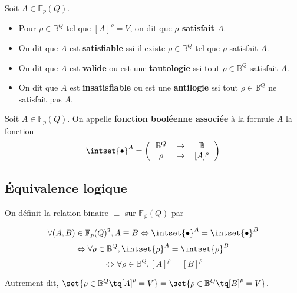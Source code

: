 \documentclass{scrartcl}
\begin{document}
			Soit $A \in \mathbb{F}_p (Q)$.

			\begin{itemize}
				\item Pour $\rho \in \mathbb{B}^Q$ tel que $[A]^\rho = V$, on dit que \textbf{$\rho$ satisfait $A$}.
				\item On dit que $A$ est \textbf{satisfiable} ssi il existe $\rho \in \mathbb{B}^Q$ tel que $\rho$ satisfait $A$.
				\item On dit que $A$ est \textbf{valide} ou est une \textbf{tautologie} ssi tout $\rho \in \mathbb{B}^Q$ satisfait $A$. 
				\item On dit que $A$ est \textbf{insatisfiable} ou est une \textbf{antilogie} ssi tout $\rho \in \mathbb{B}^Q$ ne satisfait pas $A$. 
			\end{itemize}	


			 Soit $A \in \mathbb{F}_p(Q)$. On appelle \textbf{fonction booléenne associée} à la formule $A$ la fonction
			\[
				\intset{\bullet}^A = \left(
				\begin{tabular}{c c c}
					$\mathbb{B}^Q$ & $\rightarrow$ & $\mathbb{B}$ \\
					$\rho$ & $\rightarrow$ & $[A]^\rho$
				\end{tabular}
				\right)
			\]
			

		\subsection{Équivalence logique}
			On définit la relation binaire $\equiv$ sur $\mathbb{F_p}(Q)$ par

			\[
				\forall (A,B) \in \mathbb{F}_p(Q)^2, A \equiv B \Leftrightarrow \intset{\bullet}^A = \intset{\bullet}^B
			\]\[
				\Leftrightarrow \forall \rho \in \mathbb{B}^Q, \intset{\rho}^A = \intset{\rho}^B
			\]\[
				\Leftrightarrow \forall \rho \in \mathbb{B}^Q, [A]^\rho = [B]^\rho
			\]

			Autrement dit, $\set{\rho \in \mathbb{B}^Q \tq [A]^\rho = V} = \set{\rho \in \mathbb{B}^Q \tq [B]^\rho = V}$.
\end{document}
